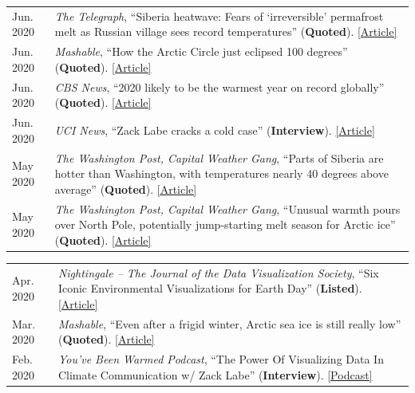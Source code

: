 \documentclass[margin,line,palatino,courier,10pt]{res}
\begin{document}
\begin{resume}
\begin{tabular}{@{}p{0.9in}p{4in}}
Jun. 2020 & \textit{The Telegraph}, ``Siberia heatwave: Fears of `irreversible' permafrost melt as Russian village sees record temperatures'' (\textbf{Quoted}). \href{https://www.telegraph.co.uk/news/2020/06/26/siberia-heatwave-fears-irreversible-permafrost-meltas-russian/}{[Article]}\\
Jun. 2020 & \textit{Mashable}, ``How the Arctic Circle just eclipsed 100 degrees'' (\textbf{Quoted}). \href{https://mashable.com/article/arctic-heat-100-degrees/}{[Article]}\\
Jun. 2020 & \textit{CBS News}, ``2020 likely to be the warmest year on record globally'' (\textbf{Quoted}). \href{https://www.cbsnews.com/news/warmest-year-on-record-2020-likely/}{[Article]}\\
Jun. 2020 & \textit{UCI News}, ``Zack Labe cracks a cold case'' (\textbf{Interview}). \href{https://medium.com/@UCISoPS/zack-labe-cracks-a-cold-case-6e8793248e9d}{[Article]}\\
May 2020 & \textit{The Washington Post, Capital Weather Gang}, ``Parts of Siberia are hotter than Washington, with temperatures nearly 40 degrees above average'' (\textbf{Quoted}). \href{https://www.washingtonpost.com/weather/2020/05/22/siberia-heat-wave/}{[Article]}\\
May 2020 & \textit{The Washington Post, Capital Weather Gang}, ``Unusual warmth pours over North Pole, potentially jump-starting melt season for Arctic ice'' (\textbf{Quoted}). \href{https://www.washingtonpost.com/weather/2020/05/14/arctic-temperature-spike-sea-ice/}{[Article]}\\
\end{tabular}
\begin{tabular}{@{}p{0.9in}p{4in}}
Apr. 2020 & \textit{Nightingale – The Journal of the Data Visualization Society}, ``Six Iconic Environmental Visualizations for Earth Day'' (\textbf{Listed}). \href{https://medium.com/nightingale/six-iconic-environmental-visualizations-for-earth-day-d7a5bdaf177b}{[Article]}\\
Mar. 2020 & \textit{Mashable}, ``Even after a frigid winter, Arctic sea ice is still really low'' (\textbf{Quoted}). \href{https://mashable.com/article/arctic-sea-ice-low-2020/}{[Article]}\\
Feb. 2020 & \textit{You’ve Been Warmed Podcast}, ``The Power Of Visualizing Data In Climate Communication w/ Zack Labe'' (\textbf{Interview}). \href{https://www.youvebeenwarmed.com/episodes/the-power-of-visualizing-data-in-climate-communication-w-zack-labe}{[Podcast]}\\

\end{tabular}
\end{resume}
\end{document}
